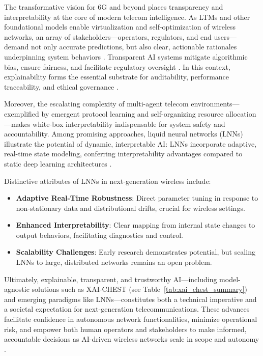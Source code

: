 \documentclass[sigconf]{acmart}
\begin{document}
The transformative vision for 6G and beyond places transparency and interpretability at the core of modern telecom intelligence. As LTMs and other foundational models enable virtualization and self-optimization of wireless networks, an array of stakeholders—operators, regulators, and end users—demand not only accurate predictions, but also clear, actionable rationales underpinning system behaviors \cite{ref41}. Transparent AI systems mitigate algorithmic bias, ensure fairness, and facilitate regulatory oversight \cite{ref7}. In this context, explainability forms the essential substrate for auditability, performance traceability, and ethical governance \cite{ref7}\cite{ref8}\cite{ref9}\cite{ref26}\cite{ref33}\cite{ref35}\cite{ref38}\cite{ref41}.

Moreover, the escalating complexity of multi-agent telecom environments—exemplified by emergent protocol learning and self-organizing resource allocation—makes white-box interpretability indispensable for system safety and accountability. Among promising approaches, liquid neural networks (LNNs) illustrate the potential of dynamic, interpretable AI: LNNs incorporate adaptive, real-time state modeling, conferring interpretability advantages compared to static deep learning architectures \cite{ref35}.

Distinctive attributes of LNNs in next-generation wireless include:

\begin{itemize}
    \item \textbf{Adaptive Real-Time Robustness}: Direct parameter tuning in response to non-stationary data and distributional drifts, crucial for wireless settings.
    \item \textbf{Enhanced Interpretability}: Clear mapping from internal state changes to output behaviors, facilitating diagnostics and control.
    \item \textbf{Scalability Challenges}: Early research demonstrates potential, but scaling LNNs to large, distributed networks remains an open problem.
\end{itemize}

Ultimately, explainable, transparent, and trustworthy AI—including model-agnostic solutions such as XAI-CHEST (see Table~\ref{tab:xai_chest_summary}) and emerging paradigms like LNNs—constitutes both a technical imperative and a societal expectation for next-generation telecommunications. These advances facilitate confidence in autonomous network functionalities, minimize operational risk, and empower both human operators and stakeholders to make informed, accountable decisions as AI-driven wireless networks scale in scope and autonomy \cite{ref41}.
\end{document}
